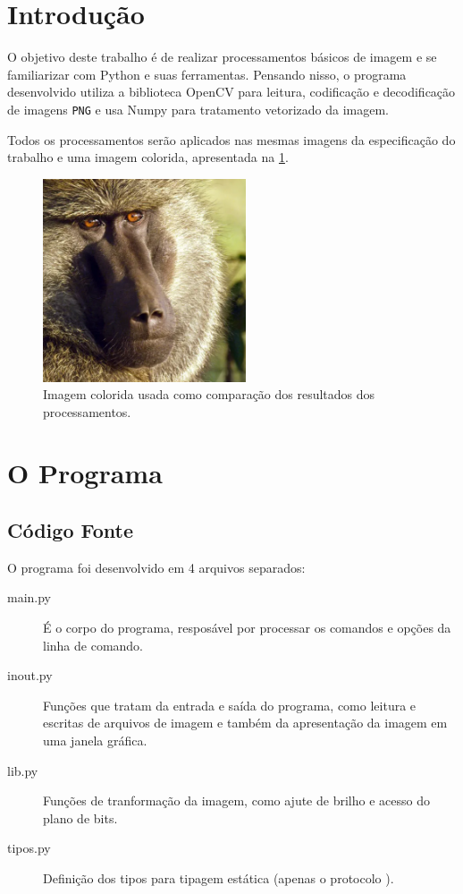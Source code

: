 \documentclass[assignment = 0]{homework}
\begin{document}
    \section{Introdução}

    O objetivo deste trabalho é de realizar processamentos básicos de imagem e se familiarizar com Python e suas ferramentas. Pensando nisso, o programa desenvolvido utiliza a biblioteca OpenCV para leitura, codificação e decodificação de imagens \texttt{PNG} e usa Numpy para tratamento vetorizado da imagem.

    Todos os processamentos serão aplicados nas mesmas imagens da especificação do trabalho e uma imagem colorida, apresentada na \cref{fig:baboon}.

    \begin{figure}[H]
        \centering
        \includegraphics[width=6cm]{baboon.png}

        \caption{Imagem colorida usada como comparação dos resultados dos processamentos.}
        \label{fig:baboon}
    \end{figure}

    \section{O Programa}

    \subsection{Código Fonte}

    O programa foi desenvolvido em 4 arquivos separados:

    \begin{description}
        \item[main.py] É o corpo do programa, resposável por processar os comandos e opções da linha de comando.

        \item[inout.py] Funções que tratam da entrada e saída do programa, como leitura e escritas de arquivos de imagem e também da apresentação da imagem em uma janela gráfica.

        \item[lib.py] Funções de tranformação da imagem, como ajute de brilho e acesso do plano de bits.

        \item[tipos.py] Definição dos tipos para tipagem estática (apenas o protocolo \autocite{ref:pep544} ).
    \end{description}
\end{document}

